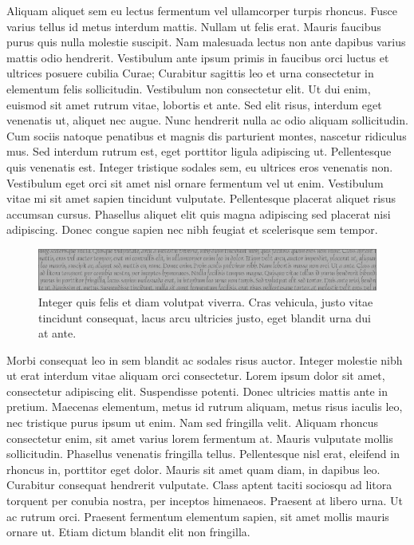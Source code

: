Aliquam aliquet sem eu lectus fermentum vel ullamcorper turpis rhoncus.
Fusce varius tellus id metus interdum mattis.
Nullam ut felis erat.
Mauris faucibus purus quis nulla molestie suscipit.
Nam malesuada lectus non ante dapibus varius mattis odio hendrerit.
Vestibulum ante ipsum primis in faucibus orci luctus et ultrices posuere cubilia Curae; Curabitur sagittis leo et urna consectetur in elementum felis sollicitudin.
Vestibulum non consectetur elit.
Ut dui enim, euismod sit amet rutrum vitae, lobortis et ante.
Sed elit risus, interdum eget venenatis ut, aliquet nec augue.
Nunc hendrerit nulla ac odio aliquam sollicitudin.
Cum sociis natoque penatibus et magnis dis parturient montes, nascetur ridiculus mus.
Sed interdum rutrum est, eget porttitor ligula adipiscing ut.
Pellentesque quis venenatis est.
Integer tristique sodales sem, eu ultrices eros venenatis non.
Vestibulum eget orci sit amet nisl ornare fermentum vel ut enim.
Vestibulum vitae mi sit amet sapien tincidunt vulputate.
Pellentesque placerat aliquet risus accumsan cursus.
Phasellus aliquet elit quis magna adipiscing sed placerat nisi adipiscing.
Donec congue sapien nec nibh feugiat et scelerisque sem tempor.

\begin{figure}[t]
  \centering
  \includegraphics[width=\linewidth]{figs/leaderboard-gray}
  \caption[Integer quis felis]{
    Integer quis felis et diam volutpat viverra.
Cras vehicula, justo vitae tincidunt consequat, lacus arcu ultricies justo, eget blandit urna dui at ante.
  }
\end{figure}

Morbi consequat leo in sem blandit ac sodales risus auctor.
Integer molestie nibh ut erat interdum vitae aliquam orci consectetur.
Lorem ipsum dolor sit amet, consectetur adipiscing elit.
Suspendisse potenti.
Donec ultricies mattis ante in pretium.
Maecenas elementum, metus id rutrum aliquam, metus risus iaculis leo, nec tristique purus ipsum ut enim.
Nam sed fringilla velit.
Aliquam rhoncus consectetur enim, sit amet varius lorem fermentum at.
Mauris vulputate mollis sollicitudin.
Phasellus venenatis fringilla tellus.
Pellentesque nisl erat, eleifend in rhoncus in, porttitor eget dolor.
Mauris sit amet quam diam, in dapibus leo.
Curabitur consequat hendrerit vulputate.
Class aptent taciti sociosqu ad litora torquent per conubia nostra, per inceptos himenaeos.
Praesent at libero urna.
Ut ac rutrum orci.
Praesent fermentum elementum sapien, sit amet mollis mauris ornare ut.
Etiam dictum blandit elit non fringilla.

